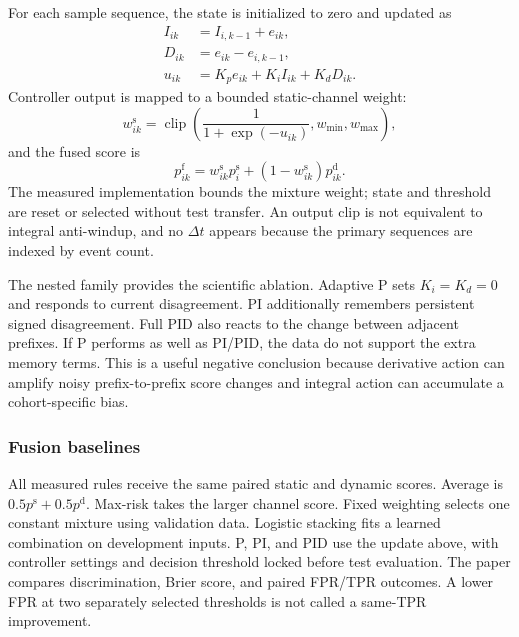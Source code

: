 For each sample sequence, the state is initialized to zero and updated as
\begin{align}
I_{ik} &= I_{i,k-1}+e_{ik}, \label{eq:pid-i}\\
D_{ik} &= e_{ik}-e_{i,k-1}, \label{eq:pid-d}\\
u_{ik} &= K_p e_{ik}+K_i I_{ik}+K_d D_{ik}. \label{eq:pid-u}
\end{align}
Controller output is mapped to a bounded static-channel weight:
\begin{equation}
w_{ik}^{\mathrm{s}}=\operatorname{clip}\!\left(
\frac{1}{1+\exp(-u_{ik})},w_{\min},w_{\max}\right),
\label{eq:pid-weight}
\end{equation}
and the fused score is
\begin{equation}
p_{ik}^{\mathrm{f}}=w_{ik}^{\mathrm{s}}p_i^{\mathrm{s}}+
(1-w_{ik}^{\mathrm{s}})p_{ik}^{\mathrm{d}}.
\label{eq:fusion}
\end{equation}
The measured implementation bounds the mixture weight; state and threshold are
reset or selected without test transfer. An output clip is not equivalent to
integral anti-windup, and no $\Delta t$ appears because the primary sequences are
indexed by event count.

The nested family provides the scientific ablation. Adaptive P sets
$K_i=K_d=0$ and responds to current disagreement. PI additionally remembers
persistent signed disagreement. Full PID also reacts to the change between
adjacent prefixes. If P performs as well as PI/PID, the data do not support the
extra memory terms. This is a useful negative conclusion because derivative
action can amplify noisy prefix-to-prefix score changes and integral action can
accumulate a cohort-specific bias.

\subsubsection{Fusion baselines}

All measured rules receive the same paired static and dynamic scores. Average is
$0.5p^{\mathrm{s}}+0.5p^{\mathrm{d}}$. Max-risk takes the larger channel score.
Fixed weighting selects one constant mixture using validation data. Logistic
stacking fits a learned combination on development inputs. P, PI, and PID use
the update above, with controller settings and decision threshold locked before
test evaluation. The paper compares discrimination, Brier score, and paired
FPR/TPR outcomes. A lower FPR at two separately selected thresholds is not called
a same-TPR improvement.

